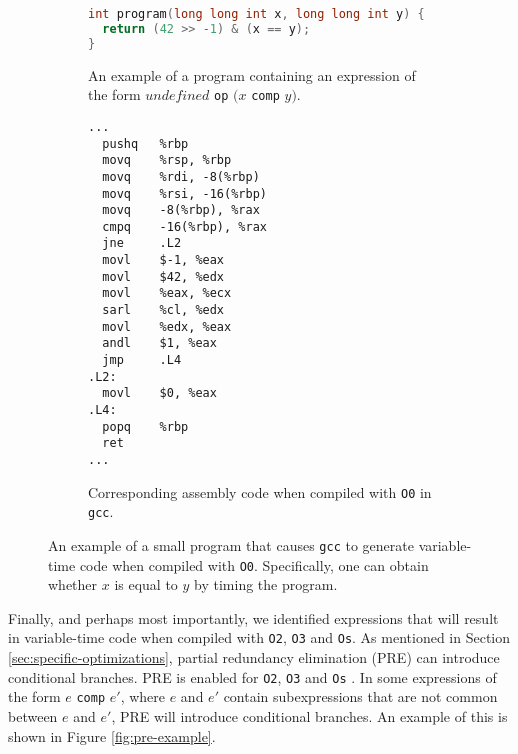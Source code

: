 \begin{figure}[H]
  \centering
     \begin{subfigure}[b]{0.41\textwidth}
        \begin{lstlisting}[style=defstyle,language={C},basicstyle=\ttfamily,breaklines=true]
int program(long long int x, long long int y) { 
  return (42 >> -1) & (x == y); 
}\end{lstlisting} 
      \vspace{8em}
      \caption{An example of a program containing an expression of the form $undefined$ \texttt{op} $(x$ \texttt{comp} $y)$.}
    \end{subfigure}
    \hspace{1cm}
    \begin{subfigure}[b]{0.3\textwidth}
      \begin{lstlisting}[style=defstyle,language={[x86masm]Assembler},basicstyle=\footnotesize\ttfamily,breaklines=true]
...
  pushq   %rbp
  movq    %rsp, %rbp
  movq    %rdi, -8(%rbp)
  movq    %rsi, -16(%rbp)
  movq    -8(%rbp), %rax
  cmpq    -16(%rbp), %rax
  jne     .L2
  movl    $-1, %eax
  movl    $42, %edx
  movl    %eax, %ecx
  sarl    %cl, %edx
  movl    %edx, %eax
  andl    $1, %eax
  jmp     .L4
.L2:
  movl    $0, %eax
.L4:
  popq    %rbp
  ret
...\end{lstlisting} 
       \caption{Corresponding assembly code when compiled with \texttt{O0} in \texttt{gcc}.}
  \end{subfigure}
  \caption{An example of a small program that causes \texttt{gcc} to generate variable-time code when compiled with \texttt{O0}. Specifically, one can obtain whether $x$ is equal to $y$ by timing the program.}
  \label{fig:vulnerable-expression}
\end{figure}

Finally, and perhaps most importantly, we identified expressions that will result in variable-time code when compiled with \texttt{O2}, \texttt{O3} and \texttt{Os}.
As mentioned in Section \ref{sec:specific-optimizations}, partial redundancy elimination (PRE) can introduce conditional branches.
PRE is enabled for \texttt{O2}, \texttt{O3} and \texttt{Os} \citep{gcc-manual}.
In some expressions of the form $e$ \texttt{comp} $e'$, where $e$ and $e'$ contain subexpressions that are not common between $e$ and $e'$, PRE will introduce conditional branches. An example of this is shown in Figure \ref{fig:pre-example}.

